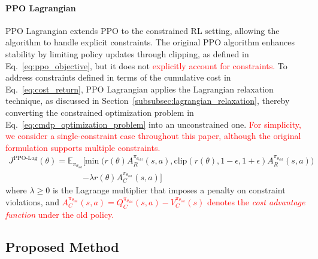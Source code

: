 \paragraph{\textbf{PPO Lagrangian}}

PPO Lagrangian extends PPO to the constrained RL setting, allowing the algorithm to handle explicit constraints.
The original PPO algorithm enhances stability by limiting policy updates through clipping, as defined in Eq.~\eqref{eq:ppo_objective}, but it does not \textcolor{red}{explicitly account for constraints.}
To address constraints defined in terms of the cumulative cost in Eq.~\eqref{eq:cost_return}, PPO Lagrangian applies the Lagrangian relaxation technique, as discussed in Section~\ref{subsubsec:lagrangian_relaxation}, thereby converting the constrained optimization problem in Eq.~\eqref{eq:cmdp_optimization_problem} into an unconstrained one.
\textcolor{red}{For simplicity, we consider a single-constraint case throughout this paper, although the original formulation supports multiple constraints.}
\begin{equation} \label{eq:ppo_lagrangian_objective}
    \begin{aligned} J^{\text{PPO-Lag}}(\theta)
        = \mathbb{E}_{\pi_{\theta_\text{old}}} \Big[ &\min \big( r(\theta) A^{\pi_{\theta_\text{old}}}_R (s, a), \text{clip}(r(\theta), 1 - \epsilon, 1 + \epsilon) A^{\pi_{\theta_\text{old}}}_R (s, a) \big)
        \\ &- \lambda r(\theta) A^{\pi_{\theta_\text{old}}}_C (s, a) \Big]
    \end{aligned}
\end{equation}
where $\lambda \geq 0$ is the Lagrange multiplier that imposes a penalty on constraint violations, and \textcolor{red}{$A^{\pi_{\theta_\text{old}}}_C(s, a) = Q^{\pi_{\theta_\text{old}}}_C(s, a) - V^{\pi_{\theta_\text{old}}}_C(s)$ denotes the \textit{cost advantage function} under the old policy.}



\subsection{Proposed Method}



